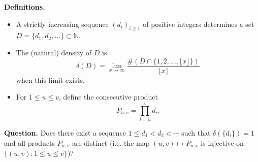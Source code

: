 \textbf{Definitions.}
\begin{itemize}
\item A strictly increasing sequence $(d_i)_{i\ge 1}$ of positive integers determines a set $D=\{d_1,d_2,\dots\}\subset\mathbb{N}$.
\item The (natural) density of $D$ is
\[
\delta(D)=\lim_{x\to\infty}\frac{\#(D\cap\{1,2,\dots,\lfloor x\rfloor\})}{\lfloor x\rfloor}
\]
when this limit exists.
\item For $1\le u\le v$, define the consecutive product
\[
P_{u,v}=\prod_{i=u}^v d_i.
\]
\end{itemize}

\textbf{Question.} Does there exist a sequence $1\le d_1<d_2<\cdots$ such that $\delta(\{d_i\})=1$ and all products $P_{u,v}$ are distinct (i.e. the map $(u,v)\mapsto P_{u,v}$ is injective on $\{(u,v):1\le u\le v\}$)?
